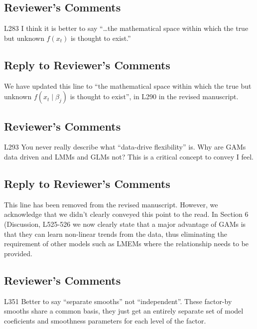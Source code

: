 \documentclass[
]{article}
\begin{document}
\hypertarget{reviewers-comments-20}{%
\subsection{Reviewer's Comments}\label{reviewers-comments-20}}

L283 I think it is better to say ``\ldots the mathematical space within which the true but unknown \(f(x_t)\) is thought to exist.''

\hypertarget{section-21}{%
\subsection{\texorpdfstring{\textcolor{reviewersblue} {Reply to Reviewer's Comments}}{}}\label{section-21}}

We have updated this line to ``the mathematical space within which the true but unknown \(f(x_t\mid \beta_j)\) is thought to exist'', in L290 in the revised manuscript.

\hypertarget{reviewers-comments-21}{%
\subsection{Reviewer's Comments}\label{reviewers-comments-21}}

L293 You never really describe what ``data-drive flexibility'' is. Why are GAMs data driven and LMMs and GLMs not? This is a critical concept to convey I feel.

\hypertarget{section-22}{%
\subsection{\texorpdfstring{\textcolor{reviewersblue} {Reply to Reviewer's Comments}}{}}\label{section-22}}

This line has been removed from the revised manuscript. However, we acknowledge that we didn't clearly conveyed this point to the read. In Section 6 (Discussion, L525-526 we now clearly state that a major advantage of GAMs is that they can learn non-linear trends from the data, thus eliminating the requirement of other models such as LMEMs where the relationship needs to be provided.

\hypertarget{reviewers-comments-22}{%
\subsection{Reviewer's Comments}\label{reviewers-comments-22}}

L351 Better to say ``separate smooths'' not ``independent''. These factor-by smooths share a common basis, they just get an entirely separate set of model coeficients and smoothness parameters for each level of the factor.
\end{document}
